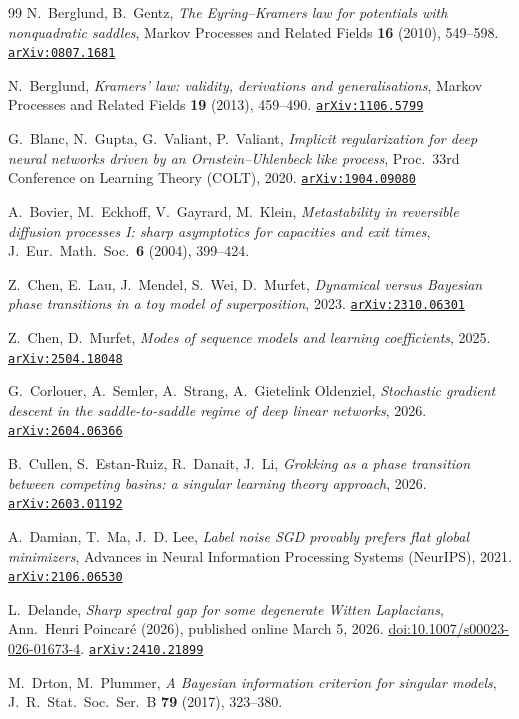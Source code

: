 \documentclass[11pt]{amsart}
\newcommand{\arxiv}[1]{\href{https://arxiv.org/abs/#1}{\texttt{arXiv:#1}}}
\theoremstyle{plain}
\theoremstyle{definition}
\begin{document}
\begin{thebibliography}{99}
N.~Berglund, B.~Gentz,
\emph{The Eyring--Kramers law for potentials with nonquadratic saddles},
Markov Processes and Related Fields \textbf{16} (2010), 549--598.
\arxiv{0807.1681}

N.~Berglund,
\emph{Kramers' law: validity, derivations and generalisations},
Markov Processes and Related Fields \textbf{19} (2013), 459--490.
\arxiv{1106.5799}

G.~Blanc, N.~Gupta, G.~Valiant, P.~Valiant,
\emph{Implicit regularization for deep neural networks driven by an Ornstein--Uhlenbeck like process},
Proc.\ 33rd Conference on Learning Theory (COLT), 2020.
\arxiv{1904.09080}

A.~Bovier, M.~Eckhoff, V.~Gayrard, M.~Klein,
\emph{Metastability in reversible diffusion processes I: sharp asymptotics for capacities and exit times},
J.\ Eur.\ Math.\ Soc.\ \textbf{6} (2004), 399--424.

Z.~Chen, E.~Lau, J.~Mendel, S.~Wei, D.~Murfet,
\emph{Dynamical versus Bayesian phase transitions in a toy model of superposition},
2023. \arxiv{2310.06301}

Z.~Chen, D.~Murfet,
\emph{Modes of sequence models and learning coefficients},
2025. \arxiv{2504.18048}

G.~Corlouer, A.~Semler, A.~Strang, A.~Gietelink Oldenziel,
\emph{Stochastic gradient descent in the saddle-to-saddle regime of deep linear networks},
2026. \arxiv{2604.06366}

B.~Cullen, S.~Estan-Ruiz, R.~Danait, J.~Li,
\emph{Grokking as a phase transition between competing basins: a singular learning theory approach},
2026. \arxiv{2603.01192}

A.~Damian, T.~Ma, J.~D. Lee,
\emph{Label noise SGD provably prefers flat global minimizers},
Advances in Neural Information Processing Systems (NeurIPS), 2021.
\arxiv{2106.06530}

L.~Delande,
\emph{Sharp spectral gap for some degenerate Witten Laplacians},
Ann.\ Henri Poincar\'e (2026), published online March 5, 2026.
\href{https://doi.org/10.1007/s00023-026-01673-4}{doi:10.1007/s00023-026-01673-4}.
\arxiv{2410.21899}

M.~Drton, M.~Plummer,
\emph{A Bayesian information criterion for singular models},
J.\ R.\ Stat.\ Soc.\ Ser.\ B \textbf{79} (2017), 323--380.


\end{thebibliography}
\end{document}
